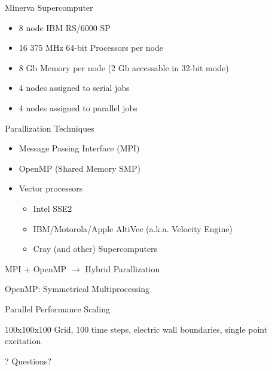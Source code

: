 \documentclass[pdf, nototal, slideBW]{prosper}
\newcommand{\insgraphic}[2]{
  \begin{center}
    \scalebox{#1}{
      \texttt{[image: \#2]}
    }
  \end{center}
}
\begin{document}
\begin{slide}{Minerva Supercomputer}
  \insgraphic{1}{minerva-sp.eps}
  
  \begin{itemize}
  \item 8 node IBM RS/6000 SP 
  \item 16 375 MHz 64-bit Processors per node
  \item 8 Gb Memory per node (2 Gb accessable in 32-bit mode)
  \item 4 nodes assigned to serial jobs
  \item 4 nodes assigned to parallel jobs
  \end{itemize}
\end{slide}

\begin{slide}{Parallization Techniques}
  \begin{itemize}
  \item Message Passing Interface (MPI)
  \item OpenMP (Shared Memory SMP)
  \item Vector processors
    \begin{itemize}
    \item Intel SSE2
    \item IBM/Motorola/Apple AltiVec (a.k.a. Velocity Engine)
    \item Cray (and other) Supercomputers
    \end{itemize}
  \end{itemize}

  MPI + OpenMP $\rightarrow$ Hybrid Parallization
\end{slide}

\begin{slide}{OpenMP: Symmetrical Multiprocessing}
  
\end{slide}

\begin{slide}{Parallel Performance Scaling}
  
  100x100x100 Grid, 100 time steps, electric wall boundaries, single
  point excitation
\end{slide}

\begin{slide}{?}
\huge
\vspace{1cm}
Questions?
\end{slide}
\end{document}
